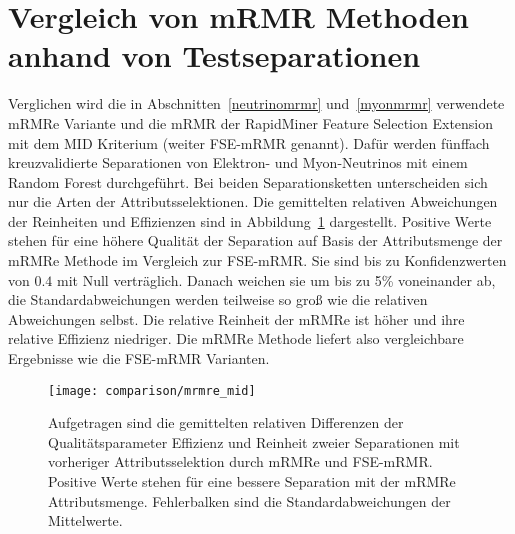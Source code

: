 \section{Vergleich von mRMR Methoden anhand von Testseparationen}
Verglichen wird die in Abschnitten~\ref{neutrinomrmr} und~\ref{myonmrmr} verwendete mRMRe Variante und die mRMR der RapidMiner Feature Selection Extension~\cite{FeatureSelection} mit dem MID Kriterium (weiter FSE-mRMR genannt).
Dafür werden fünffach kreuzvalidierte Separationen von Elektron- und Myon-Neutrinos mit einem Random Forest durchgeführt.
Bei beiden Separationsketten unterscheiden sich nur die Arten der Attributsselektionen.
Die gemittelten relativen Abweichungen der Reinheiten und Effizienzen sind in Abbildung~\ref{fig:mrmremid} dargestellt.
Positive Werte stehen für eine höhere Qualität der Separation auf Basis der Attributsmenge der mRMRe Methode im Vergleich zur FSE-mRMR.
Sie sind bis zu Konfidenzwerten von $\num{0.4}$ mit Null verträglich.
Danach weichen sie um bis zu 5\% voneinander ab, die Standardabweichungen werden teilweise so groß wie die relativen Abweichungen selbst.
Die relative Reinheit der mRMRe ist höher und ihre relative Effizienz niedriger.
Die mRMRe Methode liefert also vergleichbare Ergebnisse wie die FSE-mRMR Varianten. 
\begin{figure}
\begin{center}
    \texttt{[image: comparison/mrmre\_mid]}
\end{center}
\vspace{-2em}
\caption{Aufgetragen sind die gemittelten relativen Differenzen der Qualitätsparameter Effizienz und Reinheit zweier Separationen mit vorheriger Attributsselektion durch mRMRe und FSE-mRMR. Positive Werte  stehen für eine bessere Separation mit der mRMRe Attributsmenge. Fehlerbalken sind die Standardabweichungen der Mittelwerte.}
\label{fig:mrmremid}
\end{figure}




